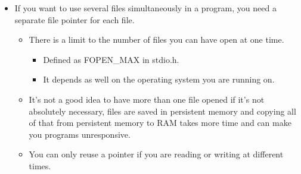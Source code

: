 \begin{itemize}
    \item If you want to use several files simultaneously in a program, you need a separate file pointer for each file.
        \begin{itemize}
            \item There is a limit to the number of files you can have open at one time.
                \begin{itemize}
                    \item Defined as FOPEN\_MAX in stdio.h.
                    \item It depends as well on the operating system you are running on.
                \end{itemize}
            
            \item It's not a good idea to have more than one file opened if it's not absolutely necessary, files are saved in persistent memory and copying all of that from persistent memory to RAM takes more time and can make you programs unresponsive.
            \item You can only reuse a pointer if you are reading or writing at different times.
        \end{itemize}
\end{itemize}

